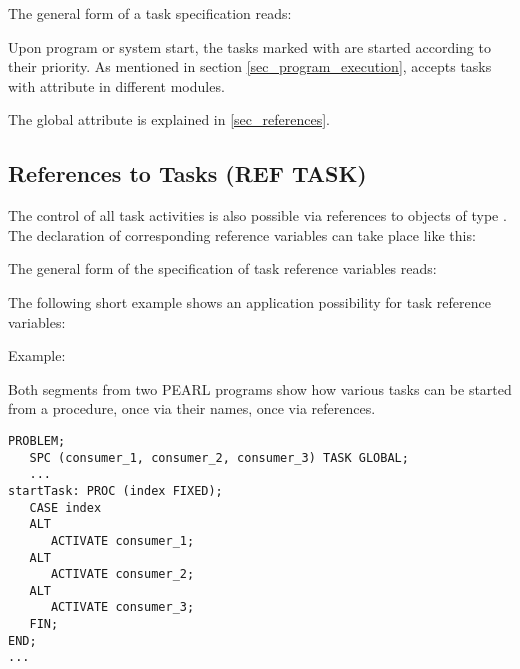 The general form of a task specification reads:

\begin{grammarframe}

\end{grammarframe}


Upon program or system start, the tasks marked with  are started
according to their priority. 
As mentioned in section \ref{sec_program_execution}, \OpenPEARL{} 
accepts tasks with  attribute in different modules.

The global attribute is explained in \ref{sec_references}.

\subsection{References to Tasks (REF TASK)}   %
\label{sec_ref_task}

The control of all task activities is also possible via references to
objects of type . The declaration of corresponding reference
variables can take place like this:

\begin{grammarframe}

\end{grammarframe}

The general form of the specification of task reference variables reads:

\begin{grammarframe}

\end{grammarframe}

The following short example shows an application possibility for task
reference variables:

Example:

Both segments from two PEARL programs show how various tasks can be
started from a procedure, once via their names, once via references.

\begin{lstlisting}
PROBLEM;
   SPC (consumer_1, consumer_2, consumer_3) TASK GLOBAL;
   ...
startTask: PROC (index FIXED);
   CASE index 
   ALT
      ACTIVATE consumer_1;
   ALT
      ACTIVATE consumer_2;
   ALT
      ACTIVATE consumer_3;
   FIN;
END;
...
\end{lstlisting}

